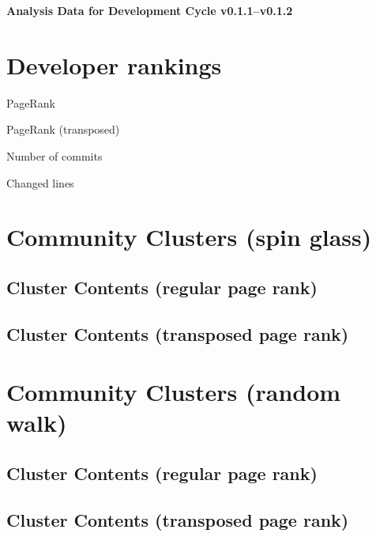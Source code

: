 \documentclass{article}
\begin{document}
\setlength{\parindent}{0pt}
\begin{center}
\begin{Large}
\textbf{Analysis Data for Development Cycle v0.1.1--v0.1.2}
\end{Large}
\end{center}
\section{Developer rankings}
\begin{small}\renewcommand{\tabcolsep}{1pt}
\begin{minipage}{0.5\linewidth}
PageRank\\

\end{minipage}%
\begin{minipage}{0.5\linewidth}
PageRank (transposed)\\

\end{minipage}

\renewcommand{\tabcolsep}{5pt}
\begin{minipage}{0.5\linewidth}
Number of commits\\

\end{minipage}%
\begin{minipage}{0.5\linewidth}
Changed lines\\

\end{minipage}
\end{small}
\newpage\section{Community Clusters (spin glass)}
\subsection{Cluster Contents (regular page rank)}
\newpage\subsection{Cluster Contents (transposed page rank)}
\newpage\section{Community Clusters (random walk)}
\subsection{Cluster Contents (regular page rank)}
\newpage\subsection{Cluster Contents (transposed page rank)}
\end{document}

